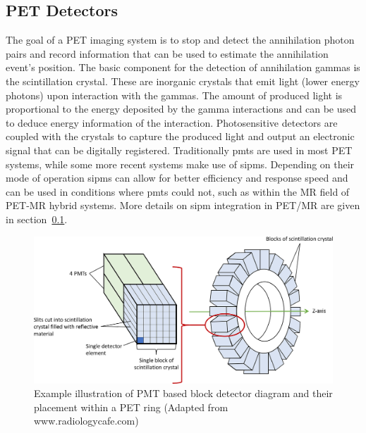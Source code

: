 \subsection{PET Detectors}
The goal of a PET imaging system is to stop and detect the annihilation photon pairs and record information that can be used to estimate the annihilation event's position.
The basic component for the detection of annihilation gammas is the scintillation crystal. These are inorganic crystals that emit light (lower energy photons) upon interaction with the gammas. The amount of produced light is proportional to the energy deposited by the gamma interactions and can be used to deduce energy information of the interaction. Photosensitive detectors are coupled with the crystals to capture the produced light and output an electronic signal that can be digitally registered. Traditionally \glspl{pmt} are used in most PET systems, while some more recent systems make use of \glspl{sipm}. Depending on their mode of operation \glspl{sipm} can allow for better efficiency and response speed and can be used in conditions where \glspl{pmt} could not, such as within the MR field of PET-MR hybrid systems. More details on \gls{sipm} integration in PET/MR are given in section~\ref{}.
%
\begin{figure} [h!]
\centering
\includegraphics[scale=0.28,angle=0]{2_Theory_Methods/figures/block_detector.png}
\caption{Example illustration of PMT based block detector diagram and their placement within a PET ring (Adapted from www.radiologycafe.com) } 
\label{fig_2:BlockDetectorAndRing}
\end{figure} 
